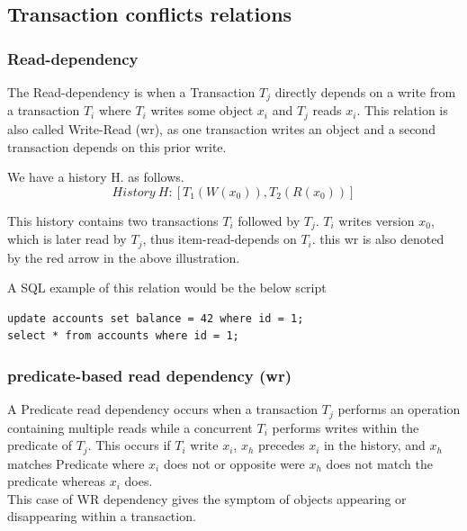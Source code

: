 \documentclass[a4paper,10pt,titlepage]{report}
\begin{document}
\subsection{Transaction conflicts relations}
\subsubsection{Read-dependency}

The Read-dependency is when a Transaction $T_j$ directly depends on a write from a transaction $T_i$ where $T_i$ writes some object $x_i$ and $T_j$ reads $x_i$. This relation is also called Write-Read (wr), as one transaction writes an object and a second transaction depends on this prior write.
        
\vspace{2mm}

\vspace{2mm}

We have a history H. as follows.
\begin{equation}
    History\ H: [T_1(W(x_0)), T_2(R(x_0))]
\end{equation}

This history contains two transactions $T_i$ followed by $T_j$. $T_i$ writes version $x_0$, which is later read by $T_j$, thus item-read-depends on $T_i$. this wr is also denoted by the red arrow in the above illustration.
    
A SQL example of this relation would be the below script
        
\begin{lstlisting}
update accounts set balance = 42 where id = 1;
select * from accounts where id = 1;
\end{lstlisting}
        
        
\subsubsection{predicate-based read dependency (wr)}
A Predicate read dependency occurs when a transaction $T_j$ performs an operation containing multiple reads while a concurrent $T_i$ performs writes within the predicate of $T_j$. This occurs if $T_i$ write $x_i$, $x_h$ precedes $x_i$ in the history, and $x_h$ matches Predicate where $x_i$ does not or opposite were $x_h$ does not match the predicate whereas $x_i$ does.\\

This case of WR dependency gives the symptom of objects appearing or disappearing within a transaction. 
\end{document}

